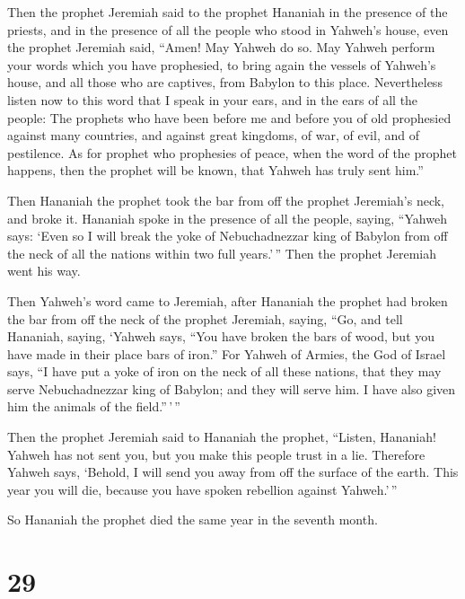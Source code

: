  Then the prophet Jeremiah said to the prophet Hananiah in
the presence of the priests, and in the presence of all the people who
stood in Yahweh's house,  even the prophet Jeremiah said,
``Amen! May Yahweh do so. May Yahweh perform your words which you have
prophesied, to bring again the vessels of Yahweh's house, and all those
who are captives, from Babylon to this place.  Nevertheless
listen now to this word that I speak in your ears, and in the ears of
all the people:  The prophets who have been before me and
before you of old prophesied against many countries, and against great
kingdoms, of war, of evil, and of pestilence.  As for
prophet who prophesies of peace, when the word of the prophet happens,
then the prophet will be known, that Yahweh has truly sent him.''

 Then Hananiah the prophet took the bar from off the
prophet Jeremiah's neck, and broke it.  Hananiah spoke in
the presence of all the people, saying, ``Yahweh says: `Even so I will
break the yoke of Nebuchadnezzar king of Babylon from off the neck of
all the nations within two full years.'\,'' Then the prophet Jeremiah
went his way.

 Then Yahweh's word came to Jeremiah, after Hananiah the
prophet had broken the bar from off the neck of the prophet Jeremiah,
saying,  ``Go, and tell Hananiah, saying, `Yahweh says,
``You have broken the bars of wood, but you have made in their place
bars of iron.''  For Yahweh of Armies, the God of Israel
says, ``I have put a yoke of iron on the neck of all these nations, that
they may serve Nebuchadnezzar king of Babylon; and they will serve him.
I have also given him the animals of the field.''\,'\,''

 Then the prophet Jeremiah said to Hananiah the prophet,
``Listen, Hananiah! Yahweh has not sent you, but you make this people
trust in a lie.  Therefore Yahweh says, `Behold, I will
send you away from off the surface of the earth. This year you will die,
because you have spoken rebellion against Yahweh.'\,''

 So Hananiah the prophet died the same year in the seventh
month.

\hypertarget{section-28}{%
\section{29}\label{section-28}}

